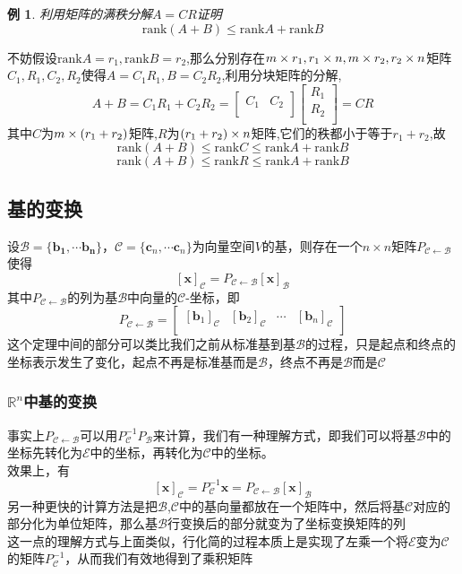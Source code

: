 \documentclass{article}
\newtheorem{example}{例}[subsection]
\newenvironment{cproof}{%
\heiti{证明}\kaishu
}{%
}
\newcommand{\ve}{\boldsymbol}
\newcommand{\rank}{\text{rank}}
\begin{document}
\begin{CJK}{UTF8}{gkai}
\begin{example}
    利用矩阵的满秩分解$A = CR$证明
    \[ \rank (A+ B) \leq \rank A + \rank B\]
\end{example}

\begin{cproof}
不妨假设$\rank A = r_1,\rank B = r_2$,那么分别存在$m\times r_1,r_1\times n,m\times r_2,r_2\times n$矩阵$C_1,R_1,C_2,R_2$使得$A = C_1 R_1 , B = C_2 R_2$,利用分块矩阵的分解,
\[A + B = C_1R_1 + C_2R_2 = 
\begin{bmatrix}
    C_1 & C_2\\
\end{bmatrix}
\begin{bmatrix}
    R_1\\
    R_2\\
\end{bmatrix}
= CR
\]
其中$C$为$m\times (r_1 + r_2)$矩阵,$R$为$(r_1 + r_2)\times n$矩阵,它们的秩都小于等于$r_1 + r_2$,故
\[\rank(A + B) \leq \rank C \leq \rank A + \rank B\]
\[\rank(A + B) \leq \rank R \leq \rank A + \rank B\]
\end{cproof}
\subsection{基的变换}
设$\mathcal{B}=\{\ve{b_1},\cdots\ve{b_n}\}$，$\mathcal{C}=\{\ve{c}_n,\cdots\ve{c}_n\}$为向量空间$V$的基，则存在一个$n\times n$矩阵$P_{\mathcal{C}\leftarrow\mathcal{B}}$使得
\[[\ve{x}]_{\mathcal{C}} = P_{\mathcal{C}\leftarrow\mathcal{B}} [\ve{x}]_{\mathcal{B}}\]
其中$P_{\mathcal{C}\leftarrow\mathcal{B}}$的列为基$\mathcal{B}$中向量的$\mathcal{C}$-坐标，即
\[P_{\mathcal{C}\leftarrow\mathcal{B}} = 
\begin{bmatrix}
    [\ve{b}_1]_{\mathcal{C}}&[\ve{b}_2]_{\mathcal{C}}&\cdots&[\ve{b}_n]_{\mathcal{C}}\\
\end{bmatrix}\]
这个定理中间的部分可以类比我们之前从标准基到基$\mathcal{B}$的过程，只是起点和终点的坐标表示发生了变化，起点不再是标准基而是$\mathcal{B}$，终点不再是$\mathcal{B}$而是$\mathcal{C}$\\

\subsubsection{$\mathbb{R}^n$中基的变换}
事实上$P_{\mathcal{C}\leftarrow\mathcal{B}}$可以用$P_{\mathcal{C}}^{-1}P_{\mathcal{B}}$来计算，我们有一种理解方式，即我们可以将基$\mathcal{B}$中的坐标先转化为$\mathcal{E}$中的坐标，再转化为$\mathcal{C}$中的坐标。\\
效果上，有
\[[\ve{x}]_{\mathcal{C}}=P_{\mathcal{C}}^{-1}\ve{x}=P_{\mathcal{C}\leftarrow\mathcal{B}}[\ve{x}]_{\mathcal{B}}\]
另一种更快的计算方法是把$\mathcal{B}$,$\mathcal{C}$中的基向量都放在一个矩阵中，然后将基$\mathcal{C}$对应的部分化为单位矩阵，那么基$\mathcal{B}$行变换后的部分就变为了坐标变换矩阵的列\\
这一点的理解方式与上面类似，行化简的过程本质上是实现了左乘一个将$\mathcal{E}$变为$\mathcal{C}$的矩阵$P_{\mathcal{C}}^{-1}$，从而我们有效地得到了乘积矩阵\\


\end{CJK}
\end{document}
